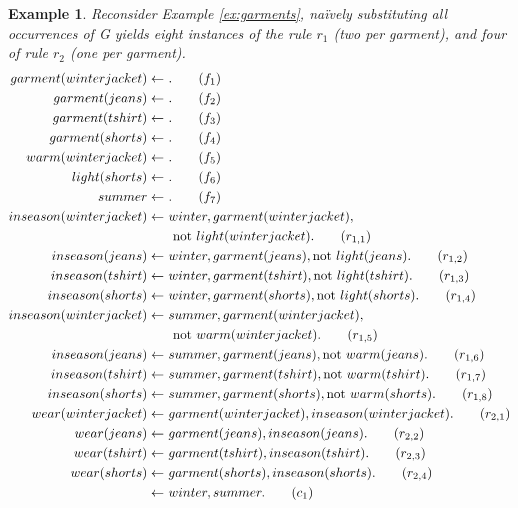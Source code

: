\documentclass{vutinfth} %
\newtheorem{example}{Example}[chapter]
\newcommand{\fail}{\mathrm{not } \ \xspace}
\newcommand{\from}{\ensuremath{\leftarrow}}
\begin{document}
\begin{example}
\label{ex:garmentsground}
Reconsider Example \ref{ex:garments}, na{\"i}vely substituting all occurrences of \emph{G} yields eight instances of the rule $r_1$ (two per garment), and four of rule $r_2$ (one per garment).
\begin{align}
garment(winterjacket)\from& \ . \tag{$f_1$}\label{ex:garmentsground:garments:begin}\\
garment(jeans)\from& \ .\tag{$f_2$}\\
garment(tshirt)\from& \ .\tag{$f_3$}\\
garment(shorts)\from& \ .\tag{$f_4$}\label{ex:garmentsground:garments:end}\\
warm(winterjacket)\from& \ .\tag{$f_5$}\label{ex:garmentsground:style:begin}\\
light(shorts)\from& \ .\tag{$f_6$}\label{ex:garmentsground:style:end}\\
summer\from& \ .\tag{$f_7$}\label{ex:garmentsground:season}\\
inseason(winterjacket) \from& \ winter, garment(winterjacket), \notag\\
& \ \ \fail light(winterjacket). \tag{$r_{1,1}$}\label{ex:garmentsground:inseason:begin}\\
inseason(jeans) \from& \ winter, garment(jeans), \fail light(jeans).\tag{$r_{1,2}$}\\
inseason(tshirt) \from& \ winter, garment(tshirt), \fail light(tshirt).\tag{$r_{1,3}$}\\
inseason(shorts) \from& \ winter, garment(shorts), \fail light(shorts).\tag{$r_{1,4}$}\\
inseason(winterjacket) \from& \ summer, garment(winterjacket), \notag\\
& \ \ \fail warm(winterjacket).\tag{$r_{1,5}$}\\
inseason(jeans) \from& \ summer, garment(jeans), \fail warm(jeans).\tag{$r_{1,6}$}\\
inseason(tshirt) \from& \ summer, garment(tshirt), \fail warm(tshirt).\tag{$r_{1,7}$}\\
inseason(shorts) \from& \ summer, garment(shorts), \fail warm(shorts). \tag{$r_{1,8}$}\label{ex:garmentsground:inseason:end}\\
wear(winterjacket) \from& \ garment(winterjacket), inseason(winterjacket).\tag{$r_{2,1}$}\\
wear(jeans) \from& \ garment(jeans), inseason(jeans).\tag{$r_{2,2}$}\\
wear(tshirt) \from& \ garment(tshirt), inseason(tshirt).\tag{$r_{2,3}$}\\
wear(shorts) \from& \ garment(shorts), inseason(shorts).\tag{$r_{2,4}$}\\
\from& \ winter, summer.\tag{$c_1$} \label{ex:garmentsground:seasons}
\end{align}
\end{example}
\end{document}

